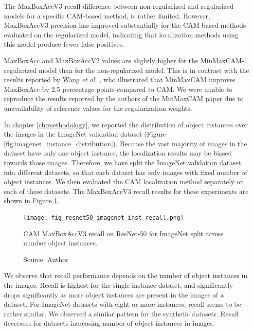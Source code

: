 The MaxBoxAccV3 recall difference between non-regularized and regularized models for a specific CAM-based method, is rather limited. However, MaxBoxAccV3 precision has improved substantially for the CAM-based methods evaluated on the regularized model, indicating that localization methods using this model produce fewer false positives.

MaxBoxAcc and MaxBoxAccV2 values are slightly higher for the MinMaxCAM-regularized model than for the non-regularized model. This is in contrast with the results reported by Wang \textit{et al.} \cite{wang2021minmaxcam}, who illustrated that MinMaxCAM improves MaxBoxAcc by 2.5 percentage points compared to CAM. We were unable to reproduce the results reported by the authors of the MinMaxCAM paper \cite{wang2021minmaxcam} due to unavailability of reference values for the regularization weights.

In chapter \ref{ch:methodology}, we reported the distribution of object instances over the images in the ImageNet validation dataset (Figure \ref{fig:imagenet_instance_distribution}). Because the vast majority of images in the dataset have only one object instance, the localization results may be biased towards those images. Therefore, we have split the ImageNet validation dataset into different datasets, so that each dataset has only images with fixed number of object instances. We then evaluated the CAM localization method separately on each of these datasets. The MaxBoxAccV3 recall results for these experiments are shown in Figure \ref{fig:resnet50_imagenet_inst_recall}. 

\begin{figure}[h]
    \begin{center}       
    \texttt{[image: fig\_resnet50\_imagenet\_inst\_recall.png]}
    \caption[CAM MaxBoxAccV3 recall on ResNet-50 for ImageNet split across number object instances]{CAM MaxBoxAccV3 recall on ResNet-50 for ImageNet split across number object instances.}
    \caption*{Source: Author}
    \label{fig:resnet50_imagenet_inst_recall}
    \end{center}
\end{figure}

We observe that recall performance depends on the number of object instances in the images. Recall is highest for the single-instance dataset, and significantly drops significantly as more object instances are present in the images of a dataset. For ImageNet datasets with eight or more instances, recall seems to be rather similar. We observed a similar pattern for the synthetic datasets: Recall decreases for datasets increasing number of object instances in images.

